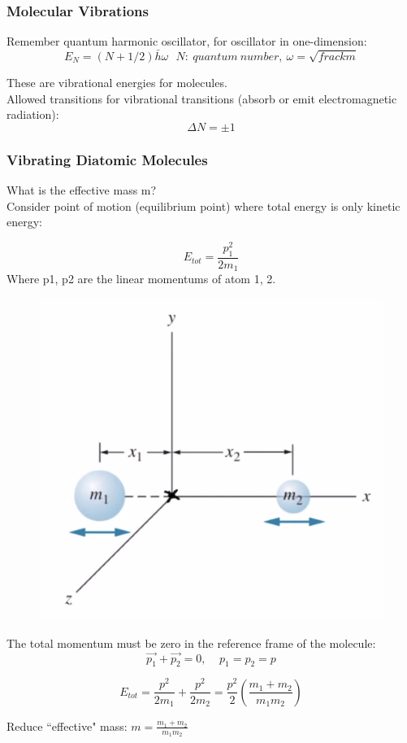 \documentclass[class=article,crop=false]{standalone}
\begin{document}
\subsubsection{Molecular Vibrations}
Remember quantum harmonic oscillator, for oscillator in one-dimension:
$$ E_N = (N + 1/2) \bar{h}\omega\ \ \ N:\ quantum\ number,\ \omega = \sqrt{frac{k}{m}} $$

These are vibrational energies for molecules. \\

Allowed transitions for vibrational transitions (absorb or emit electromagnetic radiation):
$$ \Delta N = \pm 1 $$

\subsubsection{Vibrating Diatomic Molecules}
What is the effective mass m?\\

Consider point of motion (equilibrium point) where total energy is only kinetic energy:

$$ E_{tot} = \frac{p_1^2}{2m_1} $$
Where p1, p2 are the linear momentums of atom 1, 2.

\begin{figure}[h!]
	\centering
	\includegraphics[width=.6\linewidth]{./Images/vibrations.png}
	\caption{}
\end{figure}

The total momentum must be zero in the reference frame of the molecule:
$$ \vec{p_1} + \vec{p_2} = 0,\ \ \ \ \ p_1 = p_2 = p $$

$$ E_{tot} = \frac{p^2}{2m_1} + \frac{p^2}{2m_2} = \frac{p^2}{2}\left(\frac{m_1 + m_2}{m_1m_2}\right) $$

Reduce ``effective" mass: $ m = \frac{m_1 + m_2}{m_1m_2}$ \\
\\
\end{document}
